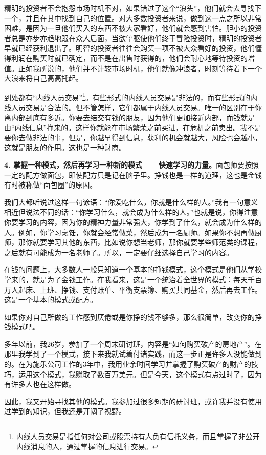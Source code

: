 精明的投资者不会抱怨市场时机不对，如果错过了这个“浪头”，他们就会去寻找下一个，并且在其中找到自己的位置。对大多数投资者来说，做到这一点之所以非常困难，是因为一旦他们买入的东西不被大家看好，他们就会感到害怕。胆小的投资者总是亦步亦趋地跟在众人后面，当欲望驱使他们终于冒险投资时，精明的投资者早就已经获利退出了。明智的投资者往往会购买一项不被大众看好的投资，他们懂得利润在购买时就已确定，而不是在出售时获得的，他们会耐心地等待投资的增值。正如我所说的，他们并不计较市场时机，他们就像冲浪者，时刻等待着下一个大浪来将自己高高托起。

到处都有“内线人员交易”\footnote{内线人员交易是指任何对公司或股票持有人负有信托义务，而且掌握了非公开内线消息的人，通过掌握的信息进行交易。}。有些形式的内线人员交易是非法的，而有些形式的内线人员交易是合法的。但不管怎样，它们都属于内线人员交易。唯一的区别在于你离内部到底有多近。你要去结交有钱的朋友，因为他们更加接近内部，而钱就是由“内线信息”挣来的。这样你就能在市场繁荣之前买进，在危机之前卖出。我不是要你去做非法的事，但是，你越早得到信息，获利的机会就越大，风险也会越小，这就是朋友的作用。这也是一种财商。

\textbf{4. 掌握一种模式，然后再学习一种新的模式——快速学习的力量。}面包师要按照一定的配方做面包，即使配方只是记在脑子里。挣钱也是一样的道理，这也是金钱有时被称做“面包圈”的原因。

我们大都听说过这样一句谚语：“你爱吃什么，你就是什么样的人。”我有一句意义相近但说法不同的话：“你学习什么，就会成为什么样的人。”也就是说，你得注意你要学习的内容，因为你的精神力量非常强大，你学到了什么，就会成为什么样的人。例如，你学习烹饪，你就会经常做菜，然后成为一名厨师。如果你不想再做厨师，那你就要学习其他的东西，比如说你想当老师，那你就要学些师范类的课程，之后就有可能成为一名老师了。所以，一定要仔细选择自己学习的内容。

在钱的问题上，大多数人一般只知道一个基本的挣钱模式，这个模式是他们从学校学来的，就是为了金钱工作。在我看来，这是一个统治着全世界的模式：每天千百万人起床、上班、挣钱、支付账单、平衡支票簿、购买共同基金，然后再去工作。这是一个基本的模式或配方。

如果你对自己所做的工作感到厌倦或是你挣的钱不够多，那么很简单，改变你的挣钱模式吧。

多年以前，我26岁，参加了一个周末研讨班，内容是“如何购买破产的房地产”。在那里我学到了一个模式，接下来我就试着付诸实践，而这一步正是许多人没能做到的。在为施乐公司工作的3年中，我用业余时间学习并掌握了购买破产的财产的技巧，运用这个模式，我赚取了数百万美元。但是今天，这个模式有点过时了，因为有许多人也在这样做。

因此，我又开始寻找其他的模式。我参加过很多短期的研讨班，或许我并没有使用过学到的知识，但我还是开阔了视野。

